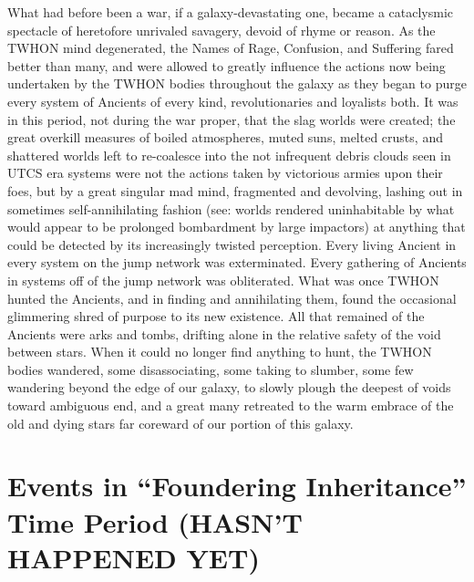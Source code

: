 What had before been a war, if a galaxy-devastating one, became a cataclysmic spectacle of heretofore unrivaled savagery, devoid of rhyme or reason. As the TWHON mind degenerated, the Names of Rage, Confusion, and Suffering fared better than many, and were allowed to greatly influence the actions now being undertaken by the TWHON bodies throughout the galaxy as they began to purge every system of Ancients of every kind, revolutionaries and loyalists both. It was in this period, not during the war proper, that the slag worlds were created; the great overkill measures of boiled atmospheres, muted suns, melted crusts, and shattered worlds left to re-coalesce into the not infrequent debris clouds seen in UTCS era systems were not the actions taken by victorious armies upon their foes, but by a great singular mad mind, fragmented and devolving, lashing out in sometimes self-annihilating fashion (see: worlds rendered uninhabitable by what would appear to be prolonged bombardment by large impactors) at anything that could be detected by its increasingly twisted perception. Every living Ancient in every system on the jump network was exterminated. Every gathering of Ancients in systems off of the jump network was obliterated. What was once TWHON hunted the Ancients, and in finding and annihilating them, found the occasional glimmering shred of purpose to its new existence. All that remained of the Ancients were arks and tombs, drifting alone in the relative safety of the void between stars. When it could no longer find anything to hunt, the TWHON bodies wandered, some disassociating, some taking to slumber, some few wandering beyond the edge of our galaxy, to slowly plough the deepest of voids toward ambiguous end, and a great many retreated to the warm embrace of the old and dying stars far coreward of our portion of this galaxy.


\section{Events in “Foundering Inheritance” Time Period (HASN’T HAPPENED YET)}

